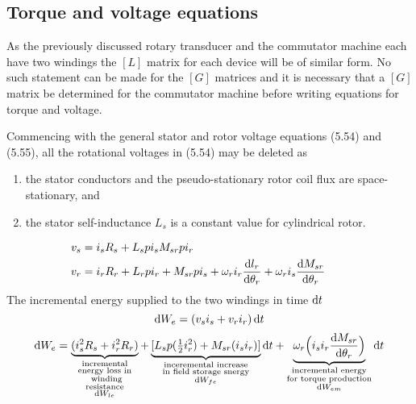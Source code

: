 \documentclass[a4paper,numbers=noenddot,12pt]{scrbook}
\begin{document}
\subsection{Torque and voltage equations}
As the previously discussed rotary transducer and the commutator machine each have two windings the $[L]$ matrix for each device will be of similar form. No such statement can be made for the $[G]$ matrices and it is necessary that a $[G]$ matrix be determined for the commutator machine before writing equations for torque and voltage.

Commencing with the general stator and rotor voltage equations (5.54) and (5.55), all the rotational voltages in (5.54) may be deleted as
\noindent
\begin{enumerate}[itemindent=0cm, label ={(\alph*)}]
    \item the stator conductors and the pseudo-stationary rotor coil flux are space-stationary, and
    \item the stator self-inductance $L_s$ is a constant value for cylindrical rotor.
\end{enumerate} 
\begin{align}
    v_s & = i_s R_s + L_s p i_s  M_{sr} p i_r \\
    v_r & = i_r R_r + L_r p i_r + M_{sr} p i_s + \omega_r i_r \frac{\dif l_r}{\dif \theta_r} + \omega_r i _s \frac{\dif M_{sr}}{\dif \theta_r} &&
\end{align}
The incremental energy supplied to the two windings in time $\dif t$
\begin{equation}
    \dif W_e = (v_s i_s + v_r i_r) \dif t
\end{equation}
\begin{equation}
    \dif W_e = \underbrace{(i_s^2 R_s + i_r^2 R_r)}_
    {\substack{\text{incremental}\\ 
    \text{energy loss in}\\ 
    \text{winding} \\
    \text{resistance} \\ 
    \dif W_{le}}} + 
    \underbrace{[L_s p (\tfrac{1}{2}i_r^2) + M_{sr}(i_s i_r)]}_
    {\substack{\text{inceremental increase}\\
    \text{in field storage snergy}\\
    \dif W_{fe}}}
    \dif t
    + \underbrace{\omega_r \Big( i_s i_r \frac{\dif M_{sr}}{\dif \theta_r} \Big)}_
    {\substack{\text{incremental energy} \\
    \text{for torque production} \\
    \dif W_{em}}}
    \dif t		
\end{equation}
\end{document}
